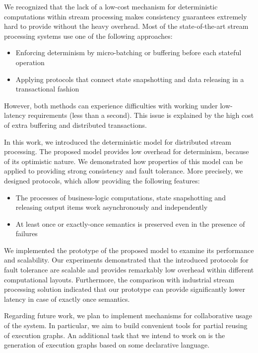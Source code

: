 
\label {fs-conclusion-seciton}

We recognized that the lack of a low-cost mechanism for deterministic computations within stream processing makes consistency guarantees extremely hard to provide without the heavy overhead. Most of the state-of-the-art stream processing systems use one of the following approaches: 
\begin{itemize}
    \item Enforcing determinism by micro-batching or buffering before each stateful operation
    \item Applying protocols that connect state snapshotting and data releasing in a transactional fashion
\end{itemize}

However, both methods can experience difficulties with working under low-latency requirements (less than a second). This issue is explained by the high cost of extra buffering and distributed transactions.

In this work, we introduced the deterministic model for distributed stream processing. The proposed model provides low overhead for determinism, because of its optimistic nature. We demonstrated how properties of this model can be applied to providing strong consistency and fault tolerance. More precisely, we designed protocols, which allow providing the following features:

\begin{itemize}
    \item The processes of business-logic computations, state snapshotting and releasing output items work asynchronously and independently
    \item At least once or exactly-once semantics is preserved even in the presence of failures
\end{itemize}

We implemented the prototype of the proposed model to examine its performance and scalability. Our experiments demonstrated that the introduced protocols for fault tolerance are scalable and provides remarkably low overhead within different computational layouts. Furthermore, the comparison with industrial stream processing solution indicated that our prototype can provide significantly lower latency in case of exactly once semantics.

Regarding future work, we plan to implement mechanisms for collaborative usage of the system. In particular, we aim to build convenient tools for partial reusing of execution graphs. An additional task that we intend to work on is the generation of execution graphs based on some declarative language.
